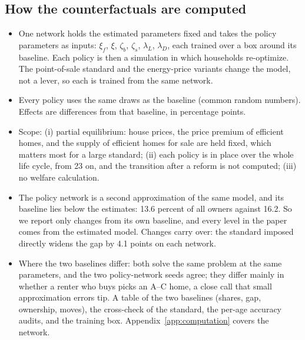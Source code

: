 \subsection{How the counterfactuals are computed}

\begin{itemize}
  \item {} One network holds the estimated parameters fixed and
    takes the policy parameters as inputs: $\xi_f$, $\xi$, $\zeta_b$,
    $\zeta_s$, $\lambda_L$, $\lambda_D$, each trained over a box around its
    baseline. Each policy is then a simulation in which households
    re-optimize. The point-of-sale standard and the energy-price variants
    change the model, not a lever, so each is trained from the same network.
  \item {} Every policy uses the same draws as the baseline (common
    random numbers). Effects are differences from that baseline, in
    percentage points.
  \item {} Scope: (i) partial equilibrium: house prices, the price
    premium of efficient homes, and the supply of efficient homes for sale
    are held fixed, which matters most for a large standard; (ii) each
    policy is in place over the whole life cycle, from 23 on, and the
    transition after a reform is not computed; (iii) no welfare
    calculation.
  \item {} The policy network is a second
    approximation of the same model, and its baseline lies below the
    estimates: 13.6 percent of all owners against 16.2. So we report only
    changes from its own baseline, and every level in the paper comes from
    the estimated model. Changes carry over: the standard imposed directly
    widens the gap by 4.1 points on each network.
  \item {} Where the two baselines differ: both solve the
    same problem at the same parameters, and the two policy-network seeds
    agree; they differ mainly in whether a renter who buys picks an A--C
    home, a close call that small approximation errors tip. A table of the
    two baselines (shares, gap, ownership, moves), the cross-check of the
    standard, the per-age accuracy audits, and the training box.
    Appendix~\ref{app:computation} covers the network.
\end{itemize}
\fi

\iffalse
